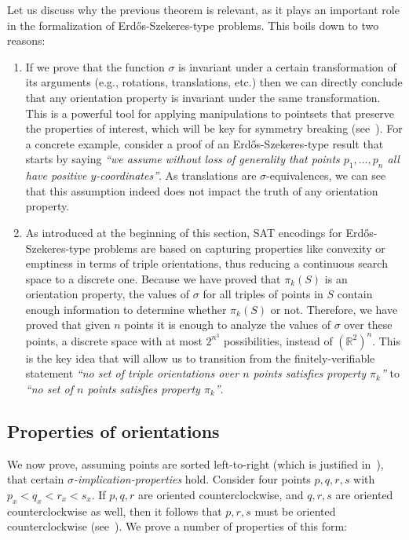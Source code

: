 Let us discuss why the previous theorem is relevant, as it plays an important role in the formalization of Erd\H{o}s-Szekeres-type problems. This boils down to two reasons:
\begin{enumerate}
  \item If we prove that the function $\sigma$ is invariant under a certain transformation of its arguments (e.g., rotations, translations, etc.) then we can directly conclude that any orientation property is invariant under the same transformation. This is a powerful tool for applying manipulations to pointsets that preserve the properties of interest, which will be key for symmetry breaking (see~).
    For a concrete example, consider a proof of an Erd\H{o}s-Szekeres-type result that starts by saying \emph{``we assume without loss of generality that points $p_1, \ldots, p_n$ all have positive $y$-coordinates''}.
    As translations are $\sigma$-equivalences, we can see that this assumption
    indeed does not impact the truth of any orientation property.
  \item As introduced at the beginning of this section, SAT encodings for Erd\H{o}s-Szekeres-type problems are based on capturing properties like convexity or emptiness in terms of triple orientations, thus reducing a continuous search space to a discrete one. Because we have proved that $\pi_k(S)$ is an orientation property, the values of $\sigma$ for all triples of points in $S$ contain enough information to determine whether $\pi_k(S)$ or not.  Therefore, we have proved that given $n$ points it is enough to analyze the values of $\sigma$ over these points, a discrete space with at most $2^{n^3}$ possibilities, instead of $\left(\mathbb{R}^2\right)^n$. This is the key idea that will allow us to transition from the finitely-verifiable statement \emph{``no set of triple orientations over $n$ points satisfies property $\pi_k$''} to \emph{``no set of $n$ points satisfies property $\pi_k$''}.
\end{enumerate}

\subsection{Properties of orientations}\label{sec:sigma-props}

We now prove,
assuming points are sorted left-to-right (which is justified in~),
that certain \emph{$\sigma$-implication-properties} hold.
Consider four points $p, q, r, s$ with $p_x < q_x < r_x < s_x$.
If $p, q, r$ are oriented counterclockwise,
and $q, r, s$ are oriented counterclockwise as well,
then it follows that $p, r, s$ must be oriented counterclockwise
(see~).
We prove a number of properties of this form:

